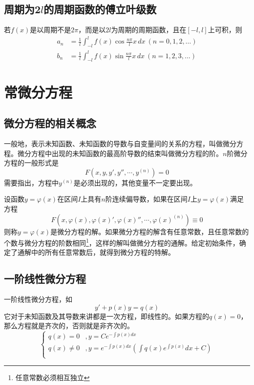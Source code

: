 \documentclass[a4paper,zihao=-4,UTF8]{ctexbook}
\begin{document}
\subsection[周期函数的傅立叶级数]{周期为2$l$的周期函数的傅立叶级数}
若$f(x)$是以周期不是$2\pi$，而是以$2l$为周期的周期函数，且在$[-l,l]$上可积，则
\begin{align*}
    a_n&=\frac 1l \int_{-l}^l f(x)\cos \frac{n\pi}{l}x\, dx\ (n=0,1,2,\ldots)\\
    b_n&=\frac 1l \int_{-l}^l f(x)\sin \frac{n\pi}{l}x\, dx\ (n=1,2,3,\ldots)
\end{align*}
\section{常微分方程}
\subsection{微分方程的相关概念}
一般地，表示未知函数、未知函数的导数与自变量间的关系的方程，叫做微分方程。微分方程中出现的未知函数的最高阶导数的结束叫做微分方程的阶。$n$阶微分方程的一般形式是
\[F\left(x,y,y',y'',\cdots,y^{(n)}\right)=0\]
需要指出，方程中$y^{(n)}$是必须出现的，其他变量不一定要出现。

设函数$y=\varphi(x)$在区间$I$上具有$n$阶连续偏导数，如果在区间$I$上$y=
\varphi(x)$满足方程
\[F\left(x,\varphi(x),\varphi(x)',\varphi(x)'',\cdots,\varphi(x)^{(n)}\right)\equiv0\]
则称$y=\varphi(x)$是微分方程的解。如果微分方程的解含有任意常数，且任意常数的个数与微分方程的阶数相同\footnote{任意常数必须相互独立}，这样的解叫做微分方程的通解。给定初始条件，确定了通解中的所有任意常数后，就得到微分方程的特解。
\subsection{一阶线性微分方程}
一阶线性微分方程，如
\[y'+p(x)y=q(x)\]
它对于未知函数及其导数来讲都是一次方程，即线性的。如果方程的$q(x)=0$，那么方程就是齐次的，否则就是非齐次的。
\[\begin{cases}
q(x)=0&,y=Ce^{-\int p(x)dx}\\
q(x)\ne0&,y=e^{-\int p(x)dx}\left(\int q(x)e^{\int p(x)}dx+C\right)\\
\end{cases}\]
\end{document}

